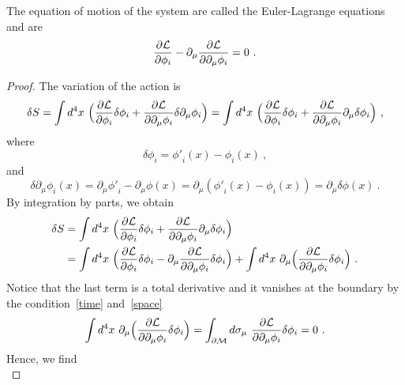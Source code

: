     The equation of motion of the system are called the Euler-Lagrange equations and are
    \begin{equation}\label{eleq}
        \frac{\partial\mathcal L}{\partial\phi_i} - \partial_\mu \frac{\partial\mathcal L}{\partial\partial_\mu \phi_i} = 0 ~.
    \end{equation}
    \begin{proof}
        The variation of the action is 
        \begin{equation*}
            \delta S = \int d^4 x ~ \Big ( \frac{\partial\mathcal L}{\partial\phi_i} \delta \phi_i + \frac{\partial\mathcal L}{\partial\partial_\mu \phi_i} \delta \partial_\mu \phi_i \Big) = \int d^4 x ~ \Big ( \frac{\partial\mathcal L}{\partial\phi_i} \delta \phi_i + \frac{\partial\mathcal L}{\partial\partial_\mu \phi_i} \partial_\mu \delta \phi_i \Big) ~,
        \end{equation*}
        where
        \begin{equation*}
            \delta \phi_i = {\phi'}_i(x) - \phi_i(x) ~,
        \end{equation*} 
        and 
        \begin{equation*}
            \delta \partial_\mu \phi_i(x) = \partial_\mu {\phi'}_i - \partial_\mu \phi(x) = \partial_\mu ({\phi'}_i(x) - \phi_i(x)) = \partial_\mu \delta \phi(x) ~.
        \end{equation*}
        By integration by parts, we obtain
        \begin{equation*}
        \begin{aligned}
            \delta S & = \int d^4 x ~ \Big ( \frac{\partial\mathcal L}{\partial\phi_i} \delta \phi_i + \frac{\partial\mathcal L}{\partial\partial_\mu \phi_i} \partial_\mu \delta \phi_i \Big) \\ & = \int d^4 x ~ \Big( \frac{\partial\mathcal L}{\partial\phi_i} \delta \phi_i - \partial_\mu \frac{\partial\mathcal L}{\partial\partial_\mu \phi_i} \delta \phi_i \Big) + \int d^4x ~ \partial_\mu \Big( \frac{\partial\mathcal L }{\partial\partial_\mu \phi_i} \delta \phi_i \Big) ~.
        \end{aligned}
        \end{equation*}
        Notice that the last term is a total derivative and it vanishes at the boundary by the condition~\eqref{time} and~\eqref{space}
        \begin{equation*}
            \int d^4x ~ \partial_\mu \Big( \frac{\partial\mathcal L }{\partial\partial_\mu \phi_i} \delta \phi_i \Big) = \int_{\partial \mathcal M} d \sigma_\mu ~ \frac{\partial\mathcal L }{\partial\partial_\mu \phi_i} \delta \phi_i = 0 ~.
        \end{equation*}
        Hence, we find 
        \begin{equation*}

\end{equation*}
\end{proof}
